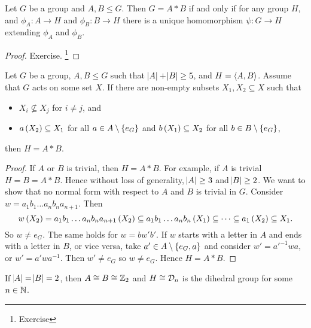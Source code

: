 \begin{proposition}
Let $ G $ be a group and $ A, B \le G $. Then $ G = A * B $ if and only if for any group $ H $, and $ \phi_A : A \to H $ and $ \phi_B : B \to H $ there is a unique homomorphism $ \psi : G \to H $ extending $ \phi_A $ and $ \phi_B $.
\end{proposition}

\begin{proof}
Exercise. \footnote{Exercise}
\end{proof}

\begin{lemma}
Let $ G $ be a group, $ A, B \le G $ such that $ \abs{A} + \abs{B} \ge 5 $, and $ H = \left\langle A, B \right\rangle $. Assume that $ G $ acts on some set $ X $. If there are non-empty subsets $ X_1, X_2 \subseteq X $ such that
\begin{itemize}
\item $ X_i \not\subseteq X_j $ for $ i \ne j $, and
\item $ a\br{X_2} \subseteq X_1 $ for all $ a \in A \setminus \cbr{e_G} $ and $ b\br{X_1} \subseteq X_2 $ for all $ b \in B \setminus \cbr{e_G} $,
\end{itemize}
then $ H = A * B $.
\end{lemma}

\begin{proof}
If $ A $ or $ B $ is trivial, then $ H = A * B $. For example, if $ A $ is trivial $ H = B = A * B $. Hence without loss of generality, $ \abs{A} \ge 3 $ and $ \abs{B} \ge 2 $. We want to show that no normal form with respect to $ A $ and $ B $ is trivial in $ G $. Consider $ w = a_1b_1 \dots a_nb_na_{n + 1} $. Then
$$ w\br{X_2} = a_1b_1 \dots a_nb_na_{n + 1}\br{X_2} \subseteq a_1b_1 \dots a_nb_n\br{X_1} \subseteq \dots \subseteq a_1\br{X_2} \subseteq X_1. $$
So $ w \ne e_G $. The same holds for $ w = bw'b' $. If $ w $ starts with a letter in $ A $ and ends with a letter in $ B $, or vice versa, take $ a' \in A \setminus \cbr{e_G, a} $ and consider $ w' = a'^{-1}wa $, or $ w' = a'wa^{-1} $. Then $ w' \ne e_G $ so $ w \ne e_G $. Hence $ H = A * B $.
\end{proof}

\begin{remark}
If $ \abs{A} = \abs{B} = 2 $, then $ A \cong B \cong \mathbb{Z}_2 $ and $ H \cong \mathcal{D}_n $ is the dihedral group for some $ n \in \mathbb{N} $.
\end{remark}

